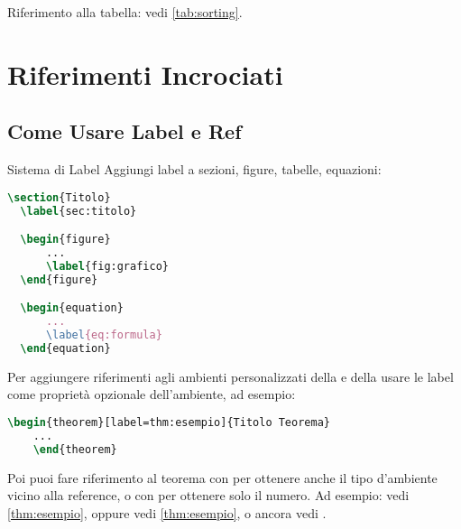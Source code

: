 \documentclass{csnotes}
\begin{document}
Riferimento alla tabella: vedi \cref{tab:sorting}.


\section{Riferimenti Incrociati}

\subsection{Come Usare Label e Ref}

\begin{example}{Sistema di Label}
Aggiungi label a sezioni, figure, tabelle, equazioni:
  \begin{lstlisting}[language=TeX]
  \section{Titolo}
  \label{sec:titolo}

  \begin{figure}
      ...
      \label{fig:grafico}
  \end{figure}

  \begin{equation}
      ...
      \label{eq:formula}
  \end{equation}
  \end{lstlisting}
\end{example}

\begin{warning}{}
  Per aggiungere riferimenti agli ambienti personalizzati della  e della  usare le label come proprietà opzionale dell'ambiente, ad esempio:
  \begin{lstlisting}[language=TeX]
    \begin{theorem}[label=thm:esempio]{Titolo Teorema}
    ...
    \end{theorem}
  \end{lstlisting}
  Poi puoi fare riferimento al teorema con  per ottenere anche il tipo d'ambiente vicino alla reference, o con  per ottenere solo il numero.
  Ad esempio: vedi \ref{thm:esempio}, oppure vedi \cref{thm:esempio}, o ancora vedi .
\end{warning}
\end{document}
